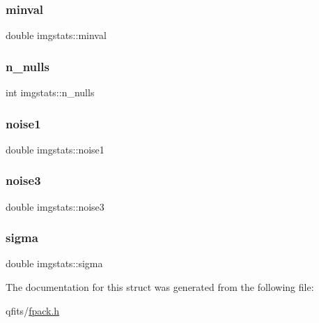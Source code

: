 \mbox{\label{structimgstats_a333178e1fbb17f91f9abd19f0b1ab0e8}} 
\subsubsection{\texorpdfstring{minval}{minval}}
{\footnotesize\ttfamily double imgstats\+::minval}

\mbox{\label{structimgstats_aaa7516571b9f0394a90a8d6508063e57}} 
\subsubsection{\texorpdfstring{n\+\_\+nulls}{n\_nulls}}
{\footnotesize\ttfamily int imgstats\+::n\+\_\+nulls}

\mbox{\label{structimgstats_a4653067a86105aff24f93784a46dc3b8}} 
\subsubsection{\texorpdfstring{noise1}{noise1}}
{\footnotesize\ttfamily double imgstats\+::noise1}

\mbox{\label{structimgstats_a60b34c6148a4aa3aa344925efe0b60df}} 
\subsubsection{\texorpdfstring{noise3}{noise3}}
{\footnotesize\ttfamily double imgstats\+::noise3}

\mbox{\label{structimgstats_a02077258ade4f34ff74082918e57cc0b}} 
\subsubsection{\texorpdfstring{sigma}{sigma}}
{\footnotesize\ttfamily double imgstats\+::sigma}



The documentation for this struct was generated from the following file\+:\begin{DoxyCompactItemize}
\item 
qfits/\hyperlink{fpack_8h}{fpack.\+h}\end{DoxyCompactItemize}

